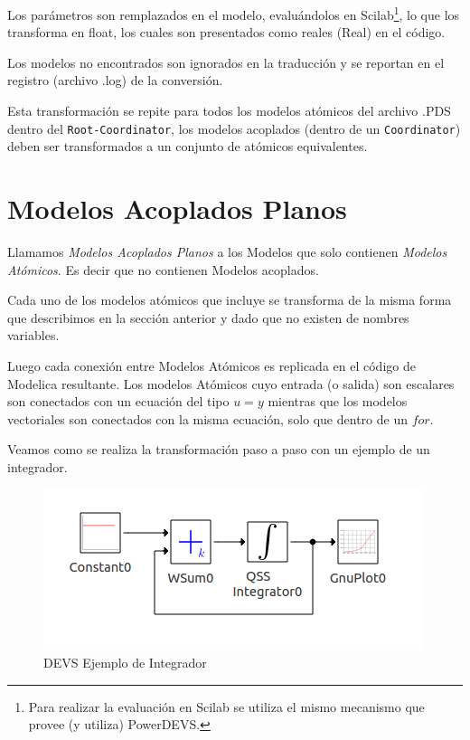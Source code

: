 	Los parámetros son remplazados en el modelo, evaluándolos en Scilab\footnote{Para realizar la evaluación en Scilab se utiliza el mismo mecanismo que 
	provee (y utiliza) PowerDEVS.}, lo que los transforma en float, los cuales son presentados como reales (Real) en el código.

	Los modelos no encontrados son ignorados en la traducción y se reportan en el registro (archivo .log) de la conversión.

	Esta transformación se repite para todos los modelos atómicos del archivo .PDS dentro del \texttt{Root-Coordinator}, los modelos acoplados 
	(dentro de un \texttt{Coordinator}) deben ser transformados a un conjunto de atómicos equivalentes.

\section{Modelos Acoplados Planos}

	Llamamos \emph{Modelos Acoplados Planos} a los Modelos que solo contienen \emph{Modelos Atómicos}. Es decir que no contienen Modelos acoplados.

	Cada uno de los modelos atómicos que incluye se transforma de la misma forma que describimos en la sección anterior y dado que no existen  
	de nombres variables.

Luego cada conexión entre Modelos Atómicos es replicada en el código de Modelica resultante. Los modelos Atómicos cuyo entrada (o salida) son escalares son conectados con un ecuación del tipo $u = y$ mientras que los modelos vectoriales son conectados con la misma ecuación, solo que dentro de un $for$.

Veamos como se realiza la transformación paso a paso con un ejemplo de un integrador.

\begin{figure}[!htbp]
\begin{center}
  \includegraphics[scale=0.5]{integrator-devs}
  \caption{DEVS Ejemplo de Integrador}
  \end{center}
   \label{fig:integrator}
\end{figure}

